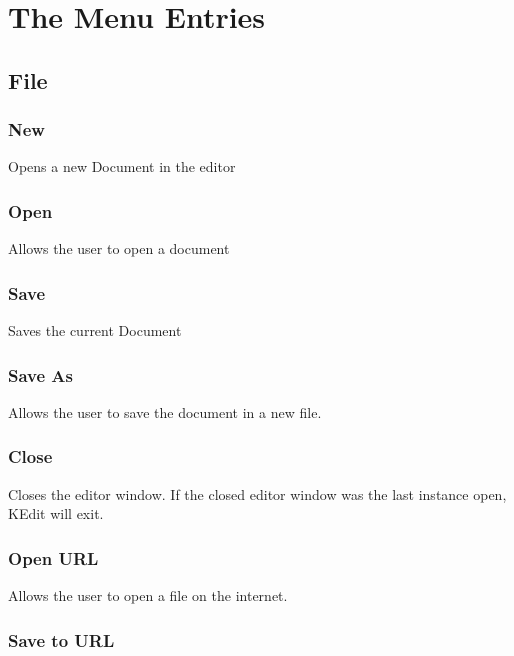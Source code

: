 \documentclass{article}
\begin{document}
\section{The Menu Entries}




\subsection{File}




\subsubsection{New}

Opens a new Document in the editor


\subsubsection{Open}

Allows the user to open a document


\subsubsection{Save}

Saves the current Document


\subsubsection{Save As}

Allows the user to save the document in a new file.


\subsubsection{Close}

Closes the editor window. If the closed editor window was the last instance open,
KEdit will exit.


\subsubsection{Open URL}

Allows the user to open a file on the internet.


\subsubsection{Save to URL}
\end{document}
